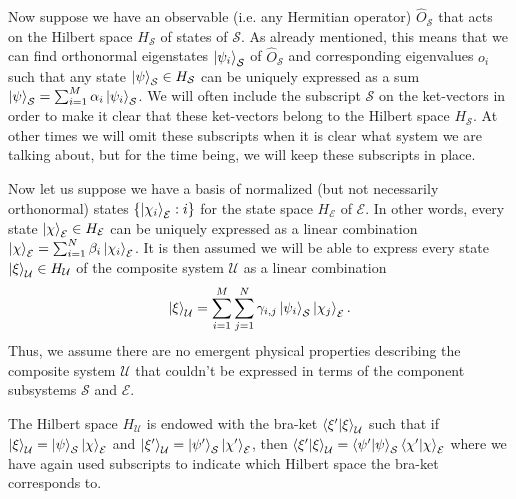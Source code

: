 Now suppose we have an observable (i.e. any Hermitian operator) $\hat{O}_{\mathcal{S}}$  %
%
that acts on the Hilbert space $H_\mathcal{S}$  %
%
of states of $\mathcal{S}$. As already mentioned, this means that we can find orthonormal eigenstates $\ket{\psi_i}_\mathcal{S}$ of $\hat{O}_{\mathcal{S}}$ and corresponding eigenvalues $o_i$ such that any state $\ket{\psi}_\mathcal{S}\in H_\mathcal{S}$ can be uniquely expressed as a sum $\ket{\psi}_\mathcal{S}=\sum_{i=1}^M\alpha_i\ket{\psi_i}_\mathcal{S}$. We will often include the subscript $\mathcal{S}$ on the ket-vectors in order to make it clear that these ket-vectors belong to the Hilbert space $H_\mathcal{S}$. At other times we will omit these subscripts when it is clear what system we are talking about, but for the time being, we will keep these subscripts in place.
     
      Now let us suppose we have a basis of normalized (but not necessarily orthonormal) states $\{\ket{\chi_i}_\mathcal{E}:i\}$ for the state space $H_\mathcal{E}$ of $\mathcal{E}$. In other words, every state $\ket{\chi}_\mathcal{E}\in H_\mathcal{E}$ can be uniquely expressed as a linear combination $\ket{\chi}_\mathcal{E}=\sum_{i=1}^N\beta_i\ket{\chi_i}_\mathcal{E}$. It is then assumed we will be able to express every state $\ket{\xi}_\mathcal{U}\in H_\mathcal{U}$ of the composite system $\mathcal{U}$ as a linear combination
      \begin{equation}\label{entangled}\ket{\xi}_\mathcal{U}=\sum_{i=1}^M\sum_{j=1}^N\gamma_{i,j}\ket{\psi_i}_\mathcal{S}\ket{\chi_j}_\mathcal{E}.
      \end{equation}
      Thus, we assume there are no emergent physical properties describing the composite system $\mathcal{U}$ that couldn't be expressed in terms of the component subsystems $\mathcal{S}$ and $\mathcal{E}$. %
      
      The Hilbert space $H_{\mathcal{U}}$ is  endowed with the bra-ket $\ip{\xi'}{\xi}_\mathcal{U}$ such that if $\ket{\xi}_\mathcal{U}=\ket{\psi}_\mathcal{S}\ket{\chi}_\mathcal{E}$ and $\ket{\xi'}_\mathcal{U}=\ket{\psi'}_\mathcal{S}\ket{\chi'}_\mathcal{E}$, then $\ip{\xi'}{\xi}_\mathcal{U}=\ip{\psi'}{\psi}_\mathcal{S}\ip{\chi'}{\chi}_\mathcal{E}$ where we have again used subscripts to indicate which Hilbert space the bra-ket corresponds to. 
      
